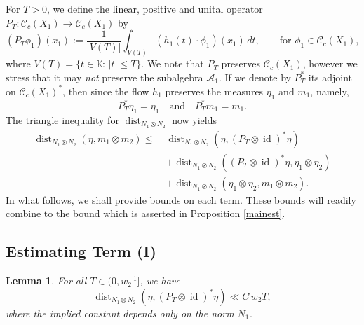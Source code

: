 \documentclass[11pt,reqno,a4paper]{amsart}
\numberwithin{equation}{section}
\newcommand{\cA}{\mathcal{A}}
\newcommand{\cC}{\mathcal{C}}
\newcommand{\bK}{\mathbb{K}}
\newcommand{\ra}{\rightarrow}
\newcommand{\qand}{\quad \textrm{and} \quad}
\DeclareMathOperator{\dist}{dist}
\DeclareMathOperator{\id}{id}
\theoremstyle{theorem}
\newtheorem{lemma}[theorem]{Lemma}
\theoremstyle{definition}
\begin{document}
For $T>0$, we define the linear, positive and unital operator $P_T : \cC_c(X_1) \ra \cC_c(X_1)$ by
\[
(P_T \phi_1)(x_1) := \frac{1}{|V(T)|} \int_{V(T)} (h_1(t) \cdot \phi_1)(x_1) \, dt, \quad\quad \textrm{for $\phi_1 \in\cC_c(X_1)$},
\]
where $V(T)=\{t\in \bK:\, |t|\le T\}$.
We note that $P_T$ preserves $\cC_c(X_1)$, however we stress that it may \emph{not} preserve the subalgebra $\cA_1$. 
If we denote by $P_T^*$ its adjoint on $\cC_c(X_1)^*$, then 
since the flow $h_1$ preserves the measures $\eta_1$ and $m_1$, namely,
\[
P_T^*\eta_1 = \eta_1 \qand P_T^* m_1 = m_1.
\] 
The  triangle inequality for $\dist_{N_1 \otimes N_2}$ now yields
\begin{align}
\dist_{N_1 \otimes N_2}(\eta,m_1 \otimes m_2)
\leq\; &
\dist_{N_1 \otimes N_2}(\eta,(P_T \otimes \id)^*\eta) \tag{I} \\
&+
\dist_{N_1 \otimes N_2}((P_T \otimes \id)^*\eta,\eta_1 \otimes \eta_2)  \tag{II} \\
&+
 \dist_{N_1 \otimes N_2}(\eta_1 \otimes \eta_2,m_1 \otimes m_2). \tag{III} 
\end{align}
In what follows, we shall provide bounds on each term. These bounds will readily combine to 
the bound which is asserted in Proposition \ref{mainest}.
 
\subsection{Estimating Term (I)} 

\begin{lemma}
\label{lemmaI}
For all $T \in (0,w_2^{-1}]$, we have
\[
\dist_{N_1 \otimes N_2}(\eta,(P_T \otimes \id)^*\eta) \ll C\, w_{2}T,
\]
where the implied constant depends only on the norm $N_1$. 
\end{lemma}
\end{document}
